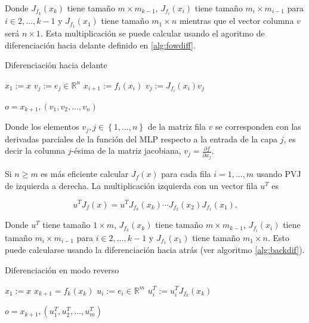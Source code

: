 Donde $J_{f_k}(x_k)$ tiene tamaño $m \times m_{k-1}$, $J_{f_i}(x_i)$ tiene tamaño $m_i \times m_{i-1}$ para $i \in {2,\ldots,k-1}$ y $J_{f_1}(x_1)$ tiene tamaño $m_1 \times n$ mientras que el vector columna $v$ será $n \times 1$. Esta multiplicación se puede calcular usando el agoritmo de diferenciación hacia delante definido en \ref{alg:fowdiff}.

\begin{algorithm}[H]
\caption{Diferenciación hacia delante}
\label{alg:fowdiff}
    \begin{algorithmic}
        \State $x_1 := x$
            \State $v_j := e_j \in \mathbb{R}^n$
        \EndFor
            \State $x_{i+1}:=f_i(x_i)$
                \State $v_j:= J_{f_i}(x_i)v_j$
            \EndFor
        \EndFor 

        
         \Return $o=x_{k+1}, \left (v_1, v_2, \ldots, v_n \right )$
        
    \end{algorithmic}
\end{algorithm}

Donde los elementos $v_j, j \in \left \{1,\ldots,n \right \}$ de la matriz fila $v$ se corresponden con las derivadas parciales de la función del MLP respecto a la entrada de la capa $j$, es decir la columna $j$-ésima de la matriz jacobiana, $v_j=\frac{\partial f}{\partial x_j}$. 

Si $n\geq m$ es más eficiente calcular $J_f(x)$ para cada fila $i=1,\ldots,m$ usando PVJ de izquierda a derecha. La multiplicación izquierda con un vector fila $u^T$ es 

$$u^TJ_f(x)=u^TJ_{f_k}(x_k) \cdots J_{f_2}(x_2) J_{f_1}(x_1).$$

Donde $u^T$ tiene tamaño $1 \times m$,  $J_{f_k}(x_k)$ tiene tamaño $m \times m_{k-1}$, $J_{f_i}(x_i)$ tiene tamaño $m_i \times m_{i-1}$ para $i \in {2,\ldots,k-1}$ y $J_{f_1}(x_1)$ tiene tamaño $m_1 \times n$. Esto puede calcularse usando la diferenciación hacia atrás (ver algoritmo \ref{alg:backdif}).

 


\begin{algorithm}
\caption{Diferenciación en modo reverso}
\label{alg:backdif}
    \begin{algorithmic}
        \State $x_1:=x$
            \State $x_{k+1} = f_k(x_k)$
        \EndFor
            \State $u_i:=e_i \in \mathbb{R}^m$
        \EndFor 
                \State $u_i^T:= u_i^T J_{f_k}(x_k)$
            \EndFor
        \EndFor 

        \Return $o=x_{k+1}, \left ( u_1^T, u_2^T, \ldots, u_m^T \right )$
    \end{algorithmic}
\end{algorithm}

